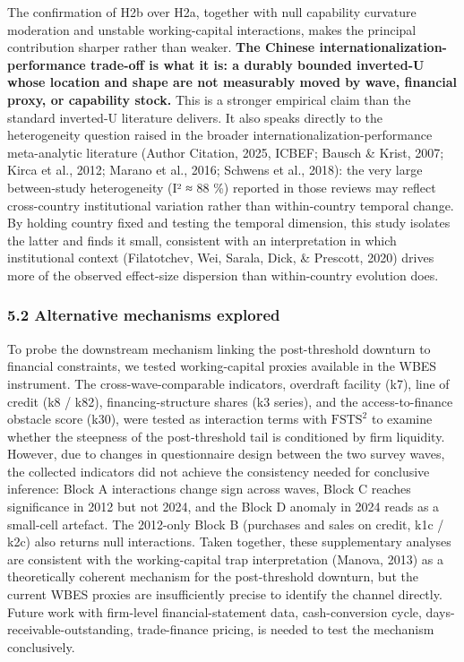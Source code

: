 \documentclass[12pt,a4paper]{article}
\begin{document}
The confirmation of H2b over H2a, together with null capability
curvature moderation and unstable working-capital interactions, makes
the principal contribution sharper rather than weaker. \textbf{The
Chinese internationalization-performance trade-off is what it is: a
durably bounded inverted-U whose location and shape are not measurably
moved by wave, financial proxy, or capability stock.} This is a stronger
empirical claim than the standard inverted-U literature delivers. It
also speaks directly to the heterogeneity question raised in the broader
internationalization-performance meta-analytic literature (Author
Citation, 2025, ICBEF; Bausch \& Krist, 2007; Kirca et al., 2012; Marano
et al., 2016; Schwens et al., 2018): the very large between-study
heterogeneity (I² ≈ 88 \%) reported in those reviews may reflect
cross-country institutional variation rather than within-country
temporal change. By holding country fixed and testing the temporal
dimension, this study isolates the latter and finds it small, consistent
with an interpretation in which institutional context (Filatotchev, Wei,
Sarala, Dick, \& Prescott, 2020) drives more of the observed effect-size
dispersion than within-country evolution does.

\hypertarget{52-alternative-mechanisms-explored}{%
\subsubsection{5.2 Alternative mechanisms
explored}\label{52-alternative-mechanisms-explored}}

To probe the downstream mechanism linking the post-threshold downturn to
financial constraints, we tested working-capital proxies available in
the WBES instrument. The cross-wave-comparable indicators, overdraft
facility (k7), line of credit (k8 / k82), financing-structure shares (k3
series), and the access-to-finance obstacle score (k30), were tested as
interaction terms with \(\mathrm{FSTS}^2\) to examine whether the
steepness of the post-threshold tail is conditioned by firm liquidity.
However, due to changes in questionnaire design between the two survey
waves, the collected indicators did not achieve the consistency needed
for conclusive inference: Block A interactions change sign across waves,
Block C reaches significance in 2012 but not 2024, and the Block D
anomaly in 2024 reads as a small-cell artefact. The 2012-only Block B
(purchases and sales on credit, k1c / k2c) also returns null
interactions. Taken together, these supplementary analyses are
consistent with the working-capital trap interpretation (Manova, 2013)
as a theoretically coherent mechanism for the post-threshold downturn,
but the current WBES proxies are insufficiently precise to identify the
channel directly. Future work with firm-level financial-statement data,
cash-conversion cycle, days-receivable-outstanding, trade-finance
pricing, is needed to test the mechanism conclusively.
\end{document}
